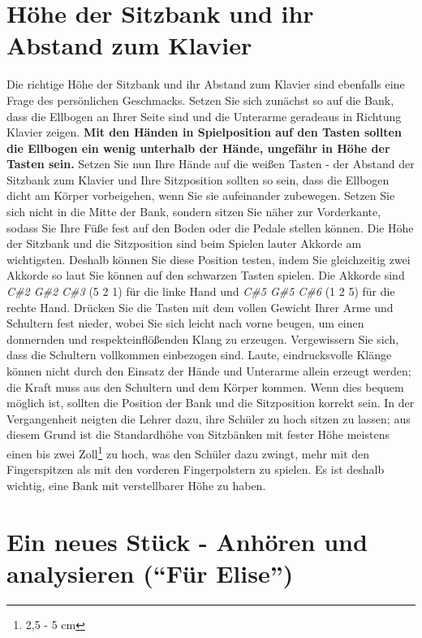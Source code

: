 \section{Höhe der Sitzbank und ihr Abstand zum Klavier}
\label{c1ii3}

Die richtige Höhe der Sitzbank und ihr Abstand zum Klavier sind ebenfalls eine Frage des persönlichen Geschmacks.
Setzen Sie sich zunächst so auf die Bank, dass die Ellbogen an Ihrer Seite sind und die Unterarme geradeaus in Richtung Klavier zeigen.
\textbf{Mit den Händen in Spielposition auf den Tasten sollten die Ellbogen ein wenig unterhalb der Hände, ungefähr in Höhe der Tasten sein.}
Setzen Sie nun Ihre Hände auf die weißen Tasten - der Abstand der Sitzbank zum Klavier und Ihre Sitzposition sollten so sein, dass die Ellbogen dicht am Körper vorbeigehen, wenn Sie sie aufeinander zubewegen.
Setzen Sie sich nicht in die Mitte der Bank, sondern sitzen Sie näher zur Vorderkante, sodass Sie Ihre Füße fest auf den Boden oder die Pedale stellen können.
Die Höhe der Sitzbank und die Sitzposition sind beim Spielen lauter Akkorde am wichtigsten.
Deshalb können Sie diese Position testen, indem Sie gleichzeitig zwei Akkorde so laut Sie können auf den schwarzen Tasten spielen.
Die Akkorde sind \textit{C\#2 G\#2 C\#3} (5 2 1) für die linke Hand und \textit{C\#5 G\#5 C\#6} (1 2 5) für die rechte Hand.
Drücken Sie die Tasten mit dem vollen Gewicht Ihrer Arme und Schultern fest nieder, wobei Sie sich leicht nach vorne beugen, um einen donnernden und respekteinflößenden Klang zu erzeugen.
Vergewissern Sie sich, dass die Schultern vollkommen einbezogen sind.
Laute, eindrucksvolle Klänge können nicht durch den Einsatz der Hände und Unterarme allein erzeugt werden; die Kraft muss aus den Schultern und dem Körper kommen.
Wenn dies bequem möglich ist, sollten die Position der Bank und die Sitzposition korrekt sein.
In der Vergangenheit neigten die Lehrer dazu, ihre Schüler zu hoch sitzen zu lassen;
aus diesem Grund ist die Standardhöhe von Sitzbänken mit fester Höhe meistens einen bis zwei Zoll\footnote{2,5 - 5 cm} zu hoch, was den Schüler dazu zwingt, mehr mit den Fingerspitzen als mit den vorderen Fingerpolstern zu spielen.
Es ist deshalb wichtig, eine Bank mit verstellbarer Höhe zu haben.


\section{Ein neues Stück - Anhören und analysieren (\enquote{Für Elise})}
\label{c1ii4}

